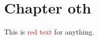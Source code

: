 \documentclass[../main.tex]{subfiles}
\begin{document}
\chapter{Chapter oth}
\label{chap:oth}

This is \textcolor{red}{red text} for anything.
\end{document}

